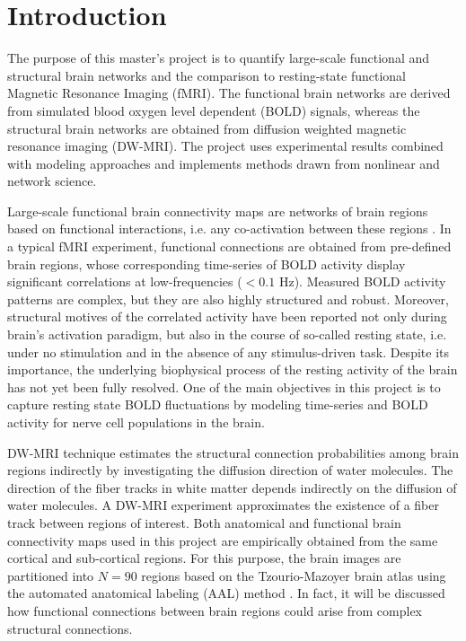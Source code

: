 
\chapter{Introduction} %

\label{Chapter1} %





The purpose of this master's project is to quantify large-scale functional and structural brain networks and the comparison to resting-state functional Magnetic Resonance Imaging (fMRI). The functional brain networks are derived from simulated blood oxygen level dependent (BOLD) signals, whereas the structural brain networks are obtained from diffusion weighted magnetic resonance imaging (DW-MRI). The project uses experimental results combined with modeling approaches and implements methods drawn from nonlinear and network science. 

Large-scale functional brain connectivity maps are networks of brain regions based on functional interactions, i.e. any co-activation between these regions \citep{BIS95, BRE10b, DAM06}. In a typical fMRI experiment,  functional connections are obtained from pre-defined brain regions, whose corresponding time-series of BOLD activity display significant correlations at low-frequencies ($< 0.1$ Hz). Measured BOLD activity patterns are complex, but they are also highly structured and robust. Moreover, structural motives of the correlated activity have been reported not only during brain's activation paradigm, but also in the course of so-called resting state, i.e. under no stimulation and in the absence of any stimulus-driven task. Despite its importance, the underlying biophysical process of the resting activity of the brain has not yet been fully resolved. One of the main objectives in this project is to capture resting state BOLD fluctuations by modeling time-series and BOLD activity for nerve cell populations in the brain. 

DW-MRI technique estimates the structural connection probabilities among brain regions indirectly by investigating the diffusion direction of water molecules. The direction of the fiber tracks in white matter depends indirectly on the diffusion of water molecules. A DW-MRI experiment approximates the existence of a fiber track between regions of interest. Both anatomical and functional brain connectivity maps used in this project are empirically obtained from the same cortical and sub-cortical regions. For this purpose, the brain images are partitioned into $N=90$ regions based on the Tzourio-Mazoyer brain atlas using the automated anatomical labeling (AAL) method \citep{TZO02}. In fact, it will be discussed how functional connections between brain regions could arise from complex structural connections. 

